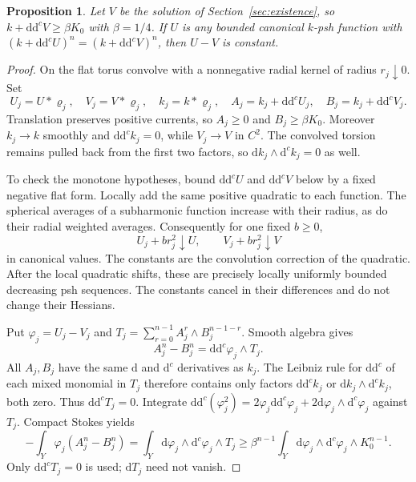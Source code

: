 \documentclass[11pt]{article}
\newtheorem{proposition}[theorem]{Proposition}
\newcommand{\ddc}{\mathrm{d}\mathrm{d}^c}
\newcommand{\dc}{\mathrm{d}^c}
\begin{document}
\begin{proposition}\label{prop:uniqueness}
Let $V$ be the solution of Section~\ref{sec:existence}, so
$k+\ddc V\ge\beta K_0$ with $\beta=1/4$.
If $U$ is any bounded canonical $k$-psh function with
$(k+\ddc U)^n=(k+\ddc V)^n$, then $U-V$ is constant.
\end{proposition}
\begin{proof}
On the flat torus convolve with a nonnegative radial kernel of radius
$r_j\downarrow0$. Set
\[
 U_j=U*\varrho_j,\quad V_j=V*\varrho_j,\quad
 k_j=k*\varrho_j,\quad
 A_j=k_j+\ddc U_j,\quad B_j=k_j+\ddc V_j.
\]
Translation preserves positive currents, so $A_j\ge0$ and
$B_j\ge\beta K_0$. Moreover $k_j\to k$ smoothly and
$\ddc k_j=0$, while $V_j\to V$ in $C^2$.
The convolved torsion remains pulled back from the first two factors,
so $\mathrm{d}k_j\wedge\dc k_j=0$ as well.

To check the monotone hypotheses, bound $\ddc U$ and $\ddc V$
below by a fixed negative flat form. Locally add the same positive
quadratic to each function. The spherical averages of a subharmonic
function increase with their radius, as do their radial weighted
averages. Consequently for one fixed $b\ge0$,
\[
 U_j+br_j^2\downarrow U,\qquad V_j+br_j^2\downarrow V
\]
in canonical values. The constants are the convolution correction of
the quadratic. After the local quadratic shifts, these are precisely
locally uniformly bounded decreasing psh sequences. The constants
cancel in their differences and do not change their Hessians.

Put $\varphi_j=U_j-V_j$ and
$T_j=\sum_{r=0}^{n-1}A_j^r\wedge B_j^{n-1-r}$. Smooth algebra gives
\[
 A_j^n-B_j^n=\ddc\varphi_j\wedge T_j.
\]
All $A_j,B_j$ have the same $\mathrm{d}$ and $\dc$ derivatives as
$k_j$. The Leibniz rule for $\ddc$ of each mixed monomial in $T_j$
therefore contains only factors $\ddc k_j$ or
$\mathrm{d}k_j\wedge\dc k_j$, both zero. Thus $\ddc T_j=0$.
Integrate
$\ddc(\varphi_j^2)=2\varphi_j\ddc\varphi_j+
2\mathrm{d}\varphi_j\wedge\dc\varphi_j$ against $T_j$.
Compact Stokes yields
\begin{equation}\label{eq:energy}
 -\int_Y\varphi_j(A_j^n-B_j^n)
 =\int_Y\mathrm{d}\varphi_j\wedge\dc\varphi_j\wedge T_j
 \ge\beta^{n-1}\int_Y\mathrm{d}\varphi_j\wedge\dc\varphi_j\wedge K_0^{n-1}.
\end{equation}
Only $\ddc T_j=0$ is used; $\mathrm{d}T_j$ need not vanish.


\end{proof}
\end{document}
